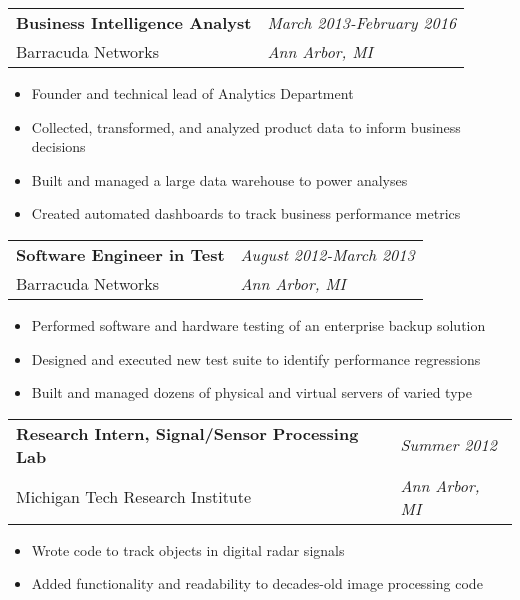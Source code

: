 \documentclass[margin,line]{res}
\begin{document}
\begin{resume}
\begin{tabular}{p{4.4in} l}
  {\bf Business Intelligence Analyst} & \emph{March 2013-February 2016}\\
  Barracuda Networks & \emph{Ann Arbor, MI}
\end{tabular}
\vspace{2pt}
\begin{itemize}\itemsep -2pt
  \item Founder and technical lead of Analytics Department
  \item Collected, transformed, and analyzed product data to inform business decisions
  \item Built and managed a large data warehouse to power analyses
  \item Created automated dashboards to track business performance metrics
\end{itemize}

\begin{tabular}{p{4.4in} l}
  {\bf Software Engineer in Test} & \emph{August 2012-March 2013}\\
  Barracuda Networks & \emph{Ann Arbor, MI}
\end{tabular}
\vspace{2pt}
\begin{itemize}\itemsep -2pt
  \item Performed software and hardware testing of an enterprise backup solution
  \item Designed and executed new test suite to identify performance regressions
  \item Built and managed dozens of physical and virtual servers of varied type
\end{itemize}

\begin{tabular}{p{4.4in} l} %
  {\bf Research Intern, Signal/Sensor Processing Lab } &  \emph{Summer 2012}\\
  Michigan Tech Research Institute & \emph{Ann Arbor, MI}
\end{tabular}
\vspace{2pt}
\begin{itemize}\itemsep -2pt %
  \item Wrote code to track objects in digital radar signals
  \item Added functionality and readability to decades-old image processing code
\end{itemize}


\end{resume}
\end{document}
